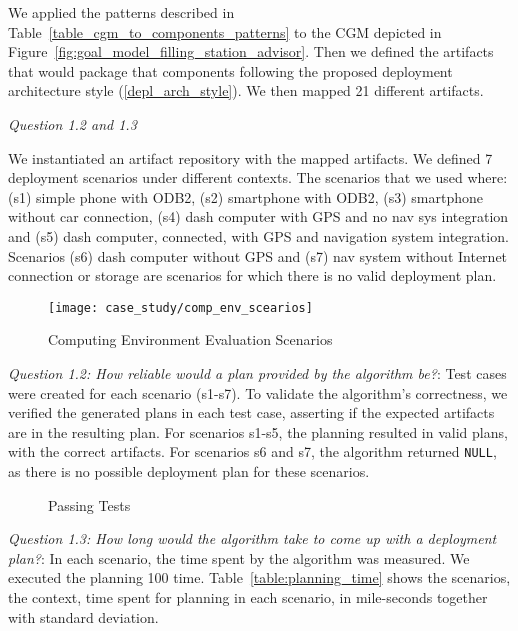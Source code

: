 We applied the patterns described in Table~\ref{table_cgm_to_components_patterns} to the CGM depicted in Figure~\ref{fig:goal_model_filling_station_advisor}. Then we defined the artifacts that would package that components following the proposed deployment architecture style (\ref{depl_arch_style}). We then mapped 21 different artifacts.

\emph{Question 1.2 and 1.3}

We instantiated an artifact repository with the mapped artifacts. We defined 7 deployment scenarios under different contexts. The scenarios that we used where: (s1) simple phone with ODB2, (s2) smartphone with ODB2, (s3) smartphone without car connection, (s4) dash computer with GPS and no nav sys integration and (s5) dash computer, connected, with GPS and navigation system integration. Scenarios (s6) dash computer without GPS and (s7) nav system without Internet connection or storage are scenarios for which there is no valid deployment plan.

\begin{figure*}[!htb]
 \centering
 \texttt{[image: case\_study/comp\_env\_scearios]}
 \caption{Computing Environment Evaluation Scenarios}
\label{fig:variability_scenarios}
\end{figure*}

\emph{Question 1.2:  How reliable would a plan provided
by the algorithm be?}: Test cases were created for each scenario (s1-s7).
To validate the algorithm’s correctness,
we verified the generated plans in each test case, asserting if the expected artifacts are in the resulting plan.
For scenarios s1-s5, the planning resulted in valid plans, with the correct artifacts. For scenarios s6 and s7, the algorithm returned \texttt{NULL}, as there is no possible deployment plan for these scenarios.

\begin{figure*}[!htb]
  \centering
  \caption{Passing Tests}
\label{testcase}
\end{figure*}



\emph{Question 1.3: How long would the algorithm take to come up with a deployment plan?}: In each scenario, the time spent by the algorithm was measured. We executed the planning 100 time. Table~\ref{table:planning_time} shows the scenarios, the context, time spent for planning in each scenario, in mile-seconds together with standard deviation.

